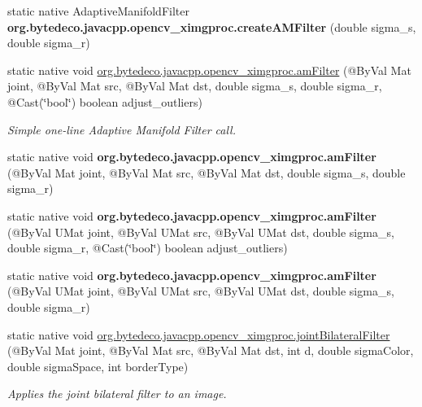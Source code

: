 \begin{DoxyCompactItemize}
static native Adaptive\+Manifold\+Filter {\bfseries org.\+bytedeco.\+javacpp.\+opencv\+\_\+ximgproc.\+create\+A\+M\+Filter} (double sigma\+\_\+s, double sigma\+\_\+r)
\item 
static native void \hyperlink{group__ximgproc__filters_ga0555fbee9503a53a6fcc0472db78f188}{org.\+bytedeco.\+javacpp.\+opencv\+\_\+ximgproc.\+am\+Filter} (@By\+Val Mat joint, @By\+Val Mat src, @By\+Val Mat dst, double sigma\+\_\+s, double sigma\+\_\+r, @Cast(\char`\"{}bool\char`\"{}) boolean adjust\+\_\+outliers)
\begin{DoxyCompactList}\small\item\em Simple one-\/line Adaptive Manifold Filter call. \end{DoxyCompactList}\item 
\mbox{\label{group__ximgproc__filters_ga1a42836096d7231852792af94658b66a}} 
static native void {\bfseries org.\+bytedeco.\+javacpp.\+opencv\+\_\+ximgproc.\+am\+Filter} (@By\+Val Mat joint, @By\+Val Mat src, @By\+Val Mat dst, double sigma\+\_\+s, double sigma\+\_\+r)
\item 
\mbox{\label{group__ximgproc__filters_gaf05032684506fef9d99a688d88d2b36e}} 
static native void {\bfseries org.\+bytedeco.\+javacpp.\+opencv\+\_\+ximgproc.\+am\+Filter} (@By\+Val U\+Mat joint, @By\+Val U\+Mat src, @By\+Val U\+Mat dst, double sigma\+\_\+s, double sigma\+\_\+r, @Cast(\char`\"{}bool\char`\"{}) boolean adjust\+\_\+outliers)
\item 
\mbox{\label{group__ximgproc__filters_gab9b985385022da4e6f13b909b363c0f4}} 
static native void {\bfseries org.\+bytedeco.\+javacpp.\+opencv\+\_\+ximgproc.\+am\+Filter} (@By\+Val U\+Mat joint, @By\+Val U\+Mat src, @By\+Val U\+Mat dst, double sigma\+\_\+s, double sigma\+\_\+r)
\item 
static native void \hyperlink{group__ximgproc__filters_ga113d231f29873e22ea1778c17307a0b5}{org.\+bytedeco.\+javacpp.\+opencv\+\_\+ximgproc.\+joint\+Bilateral\+Filter} (@By\+Val Mat joint, @By\+Val Mat src, @By\+Val Mat dst, int d, double sigma\+Color, double sigma\+Space, int border\+Type)
\begin{DoxyCompactList}\small\item\em Applies the joint bilateral filter to an image. \end{DoxyCompactList}\item 

\end{DoxyCompactItemize}
